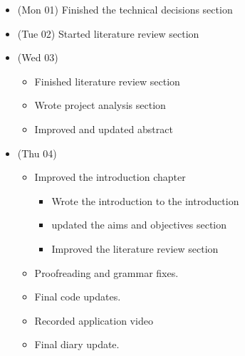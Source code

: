 \begin{itemize}
\tightlist
\item
  (Mon 01) Finished the technical decisions section
\item
  (Tue 02) Started literature review section
\item
  (Wed 03)

  \begin{itemize}
  \tightlist
  \item
    Finished literature review section
  \item
    Wrote project analysis section
  \item
    Improved and updated abstract
  \end{itemize}
\item
  (Thu 04)

  \begin{itemize}
  \tightlist
  \item
    Improved the introduction chapter

    \begin{itemize}
    \tightlist
    \item
      Wrote the introduction to the introduction
    \item
      updated the aims and objectives section
    \item
      Improved the literature review section
    \end{itemize}
  \item
    Proofreading and grammar fixes.
  \item
    Final code updates.
  \item
    Recorded application video
  \item
    Final diary update.
  \end{itemize}
\end{itemize}
